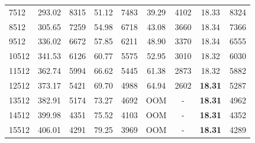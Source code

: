 \begin{table}[]
\begin{center}
\begin{tabular}{@{}lcccccccc@{}}
7512   & 293.02                          & 8315  & 51.12                           & 7483  & 39.29                           & 4102  & 18.33                           & 8324  \\
8512   & 305.65                          & 7259  & 54.98                           & 6718  & 43.08                           & 3660  & 18.34                           & 7366  \\
9512   & 336.02                          & 6672  & 57.85                           & 6211  & 48.90                           & 3370  & 18.34                           & 6555  \\
10512  & 341.53                          & 6126  & 60.77                           & 5575  & 52.95                           & 3010  & 18.32                           & 6030  \\
11512  & 362.74                          & 5994  & 66.62                           & 5445  & 61.38                           & 2873  & 18.32                           & 5882  \\
12512  & 373.17                          & 5421  & 69.70                           & 4988  & 64.94                           & 2602  & \textbf{18.31} & 5287  \\
13512  & 382.91                          & 5174  & 73.27                           & 4692  & OOM                             & -     & \textbf{18.31} & 4962  \\
14512  & 399.98                          & 4351  & 75.52                           & 4103  & OOM                             & -     & \textbf{18.31} & 4352  \\
15512  & 406.01                          & 4291  & 79.25                           & 3969  & OOM                             & -     & \textbf{18.31} & 4289  \\

 \bottomrule
\end{tabular}
\end{center}
\end{table}



